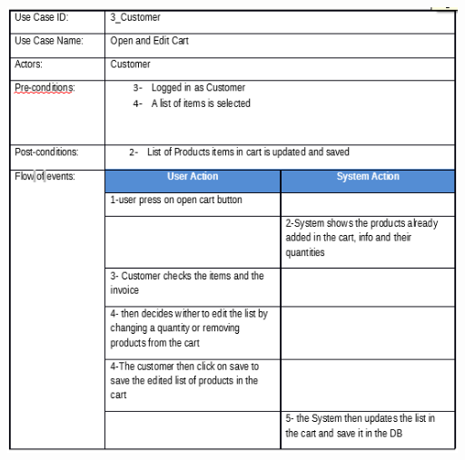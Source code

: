 \documentclass[12pt]{article}
\begin{document}
\begin{center}
	\includegraphics[width=17cm,height=13cm]{./assets/usecasetable/customer-3.png}\\
\end{center}
\end{document}
